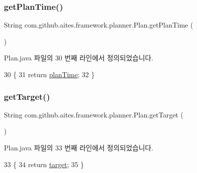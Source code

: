 \subsubsection{\texorpdfstring{get\+Plan\+Time()}{getPlanTime()}}
{\footnotesize\ttfamily String com.\+github.\+aites.\+framework.\+planner.\+Plan.\+get\+Plan\+Time (\begin{DoxyParamCaption}{ }\end{DoxyParamCaption})}



Plan.\+java 파일의 30 번째 라인에서 정의되었습니다.


\begin{DoxyCode}
30                                \{
31         \textcolor{keywordflow}{return} \mbox{\hyperlink{classcom_1_1github_1_1aites_1_1framework_1_1planner_1_1_plan_a4729359a276d3dda6350a16233754f9e}{planTime}};
32     \}
\end{DoxyCode}
\mbox{\label{classcom_1_1github_1_1aites_1_1framework_1_1planner_1_1_plan_a584286fbc03c26c0b493c8961da1598e}} 
\subsubsection{\texorpdfstring{get\+Target()}{getTarget()}}
{\footnotesize\ttfamily String com.\+github.\+aites.\+framework.\+planner.\+Plan.\+get\+Target (\begin{DoxyParamCaption}{ }\end{DoxyParamCaption})}



Plan.\+java 파일의 33 번째 라인에서 정의되었습니다.


\begin{DoxyCode}
33                              \{
34         \textcolor{keywordflow}{return} \mbox{\hyperlink{classcom_1_1github_1_1aites_1_1framework_1_1planner_1_1_plan_a3f45ee392c1af51834376a138bf8f325}{target}};
35     \}
\end{DoxyCode}
\mbox{\label{classcom_1_1github_1_1aites_1_1framework_1_1planner_1_1_plan_a56e481c028659c181b2b3123cc499dd7}} 
